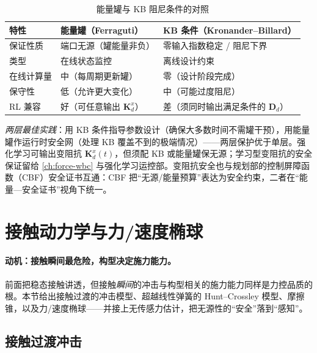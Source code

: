 \begin{table}[H]\centering\small
\caption{能量罐与 KB 阻尼条件的对照}
\label{tab:os-tank-vs-kb}
\begin{tabular}{p{} p{} p{}}
\toprule
特性 & 能量罐（Ferraguti） & KB 条件（Kronander--Billard） \\
\midrule
保证性质 & 端口无源（罐能量非负） & 零输入指数稳定 / 阻尼下界 \\
类型 & 在线状态监控 & 离线设计约束 \\
在线计算量 & 中（每周期更新罐） & 零（设计阶段完成） \\
保守性 & 低（允许更大变化） & 中（可能过度阻尼） \\
RL 兼容 & 好（可任意输出 $\mathbf K_d^x$） & 差（须同时输出满足条件的 $\mathbf D_d$） \\
\bottomrule
\end{tabular}
\end{table}

\emph{两层最佳实践}：用 KB 条件指导参数设计（确保大多数时间不需罐干预），用能量罐作运行时安全网（处理 KB 覆盖不到的极端情况）——两层保护优于单层。强化学习可输出变阻抗 $\mathbf K_d^x(t)$，但须配 KB 或能量罐保无源；学习型变阻抗的安全保证留给 \cref{ch:force-wbc} 与强化学习运控部。变阻抗安全也与规划部的控制屏障函数（CBF）安全证书互通：CBF 把“无源/能量预算”表达为安全约束，二者在“能量—安全证书”视角下统一。

\section{接触动力学与力/速度椭球}
\label{sec:os-contact-ellipsoid}

\paragraph{动机：接触瞬间最危险，构型决定施力能力。}
前面把稳态接触讲透，但接触\emph{瞬间}的冲击与构型相关的施力能力同样是力控品质的根。本节给出接触过渡的冲击模型、超越线性弹簧的 Hunt--Crossley 模型、摩擦锥，以及力/速度椭球——并接上无传感力估计，把无源性的“安全”落到“感知”。

\subsection{接触过渡冲击}
\label{sec:os-impact}

